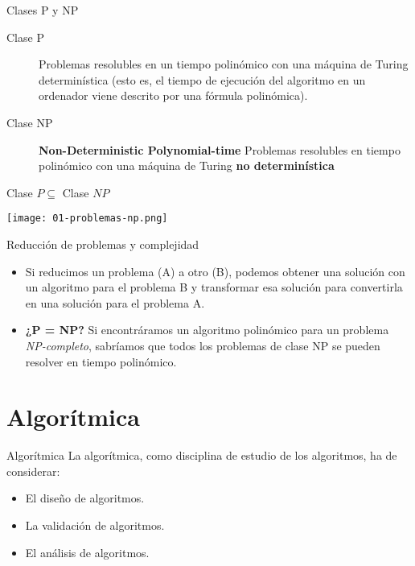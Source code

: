 \begin{frame}[c]{Clases P y NP}
  \begin{description}
    \item[Clase P] Problemas resolubles en un tiempo polinómico con una máquina
      de Turing determinística (esto es, el tiempo de ejecución del algoritmo en
      un ordenador viene descrito por una fórmula polinómica).
      \vspace{\baselineskip}
    \item[Clase NP] \textbf{Non-Deterministic Polynomial-time} Problemas
      resolubles en tiempo polinómico con una máquina de Turing \textbf{no
      determinística}
  \end{description}
\end{frame}

\begin{frame}[c]{Clase $P \subseteq $ Clase $ NP$}
  \begin{center}
    \texttt{[image: 01-problemas-np.png]}
  \end{center}
\end{frame}

\begin{frame}[c]{Reducción de problemas y complejidad}
  \begin{itemize}
    \item Si reducimos un problema (A) a otro (B), podemos obtener una solución
      con un algoritmo para el problema B y transformar esa solución para
      convertirla en una solución para el problema A.
      \vspace{\baselineskip}
    \item \textbf{¿P = NP?} Si encontráramos un algoritmo polinómico para un
      problema \textit{NP-completo}, sabríamos que todos los problemas de clase
      NP se pueden resolver en tiempo polinómico.
  \end{itemize}
\end{frame}

\section{Algorítmica}

\begin{frame}[c]{Algorítmica}
  La algorítmica, como disciplina de estudio de los algoritmos, ha de
  considerar:
  \vspace{\baselineskip}
  \begin{itemize}
    \item El diseño de algoritmos.
    \item La validación de algoritmos.
    \item El análisis de algoritmos.
  \end{itemize}
\end{frame}

